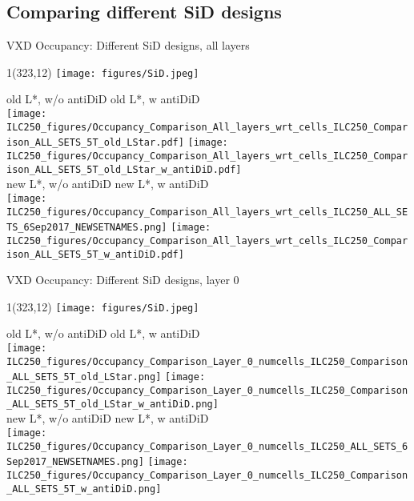\documentclass[xcolor={dvipsnames}]{beamer}
\newcommand{\sidlogo}{
  \setlength{\TPHorizModule}{1pt}
  \setlength{\TPVertModule}{1pt}
  \begin{textblock}{1}(323,12)
   \texttt{[image: figures/SiD.jpeg]}
  \end{textblock}
  }
\begin{document}
\subsection{Comparing different SiD designs}
\begin{frame}{VXD Occupancy: Different SiD designs, all layers}
\sidlogo
\begin{center}
\footnotesize old L*, w/o antiDiD \hfill old L*, w antiDiD \\
\texttt{[image: ILC250\_figures/Occupancy\_Comparison\_All\_layers\_wrt\_cells\_ILC250\_Comparison\_ALL\_SETS\_5T\_old\_LStar.pdf]}\hfill
\texttt{[image: ILC250\_figures/Occupancy\_Comparison\_All\_layers\_wrt\_cells\_ILC250\_Comparison\_ALL\_SETS\_5T\_old\_LStar\_w\_antiDiD.pdf]}\\
new L*, w/o antiDiD  \hfill new L*, w antiDiD\\
\texttt{[image: ILC250\_figures/Occupancy\_Comparison\_All\_layers\_wrt\_cells\_ILC250\_ALL\_SETS\_6Sep2017\_NEWSETNAMES.png]}\hfill
\texttt{[image: ILC250\_figures/Occupancy\_Comparison\_All\_layers\_wrt\_cells\_ILC250\_Comparison\_ALL\_SETS\_5T\_w\_antiDiD.pdf]}
\end{center}
\end{frame}
\begin{frame}{VXD Occupancy: Different SiD designs, layer 0}
\sidlogo
\begin{center}
\footnotesize old L*, w/o antiDiD \hfill old L*, w antiDiD \\
\texttt{[image: ILC250\_figures/Occupancy\_Comparison\_Layer\_0\_numcells\_ILC250\_Comparison\_ALL\_SETS\_5T\_old\_LStar.png]}\hfill
\texttt{[image: ILC250\_figures/Occupancy\_Comparison\_Layer\_0\_numcells\_ILC250\_Comparison\_ALL\_SETS\_5T\_old\_LStar\_w\_antiDiD.png]}\\
new L*, w/o antiDiD  \hfill new L*, w antiDiD\\
\texttt{[image: ILC250\_figures/Occupancy\_Comparison\_Layer\_0\_numcells\_ILC250\_ALL\_SETS\_6Sep2017\_NEWSETNAMES.png]}\hfill
\texttt{[image: ILC250\_figures/Occupancy\_Comparison\_Layer\_0\_numcells\_ILC250\_Comparison\_ALL\_SETS\_5T\_w\_antiDiD.png]}
\end{center}
\end{frame}
\end{document}
